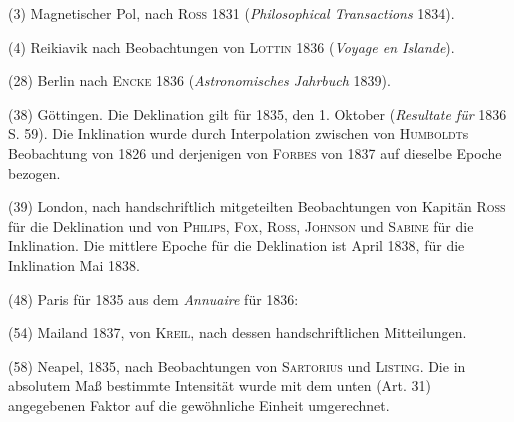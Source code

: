 (3) Magnetischer Pol, nach \textsc{Ross} 1831 (\textit{Philosophical Transactions} 1834).

(4) Reikiavik nach Beobachtungen von \textsc{Lottin} 1836 (\textit{Voyage en Islande}).

(28) Berlin nach \textsc{Encke} 1836 (\textit{Astronomisches Jahrbuch} 1839).

(38) Göttingen. Die Deklination gilt für 1835, den 1. Oktober (\textit{Resultate für} 1836 S. 59). Die Inklination wurde durch Interpolation zwischen von \textsc{Humboldt}s Beobachtung von 1826 und derjenigen von \textsc{Forbes} von 1837 auf dieselbe Epoche bezogen.

(39) London, nach handschriftlich mitgeteilten Beobachtungen von Kapitän \textsc{Ross} für die Deklination und von \textsc{Philips}, \textsc{Fox}, \textsc{Ross}, \textsc{Johnson} und \textsc{Sabine} für die Inklination. Die mittlere Epoche für die Deklination ist April 1838, für die Inklination Mai 1838.

(48) Paris für 1835 aus dem \textit{Annuaire} für 1836:

(54) Mailand 1837, von \textsc{Kreil}, nach dessen handschriftlichen Mitteilungen.

(58) Neapel, 1835, nach Beobachtungen von \textsc{Sartorius} und \textsc{Listing}. Die in absolutem Maß bestimmte Intensität wurde mit dem unten (Art. 31) angegebenen Faktor auf die gewöhnliche Einheit umgerechnet.

